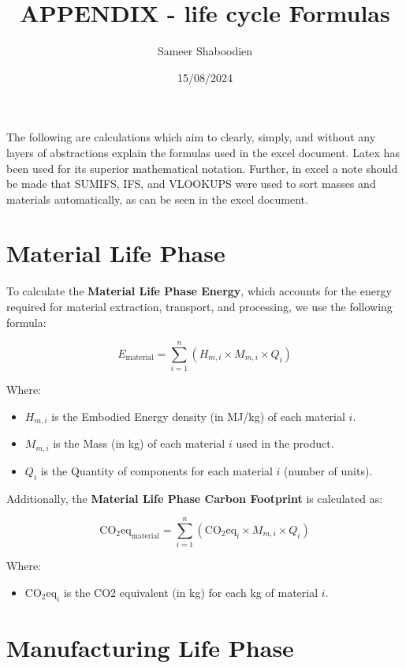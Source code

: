 \documentclass[a4paper, twocolumn]{article}
\begin{document}
\title{APPENDIX - life cycle Formulas}
\author{Sameer Shaboodien}
\date{15/08/2024}

\maketitle

The following are calculations which aim to clearly, simply, and without any layers of abstractions explain the formulas used in the excel document. Latex has been used for its superior mathematical notation. Further, in excel a note should be made that SUMIFS, IFS, and VLOOKUPS were used to sort masses and materials automatically, as can be seen in the excel document. 

\section*{Material Life Phase}

To calculate the \textbf{Material Life Phase Energy}, which accounts for the energy required for material extraction, transport, and processing, we use the following formula:

\[
E_{\text{material}} = \sum_{i=1}^{n} \left( H_{m,i} \times M_{m,i} \times Q_i \right)
\]

Where:
\begin{itemize}
    \item \( H_{m,i} \) is the Embodied Energy density (in MJ/kg) of each material \(i\).
    \item \( M_{m,i} \) is the Mass (in kg) of each material \(i\) used in the product.
    \item \( Q_i \) is the Quantity of components for each material \(i\) (number of units).
\end{itemize}

Additionally, the \textbf{Material Life Phase Carbon Footprint} is calculated as:

\[
\text{CO}_2\text{eq}_{\text{material}} = \sum_{i=1}^{n} \left( \text{CO}_2\text{eq}_i \times M_{m,i} \times Q_i \right)
\]

Where:
\begin{itemize}
    \item \( \text{CO}_2\text{eq}_i \) is the CO2 equivalent (in kg) for each kg of material \(i\).
\end{itemize}

\section*{Manufacturing Life Phase}
\end{document}
